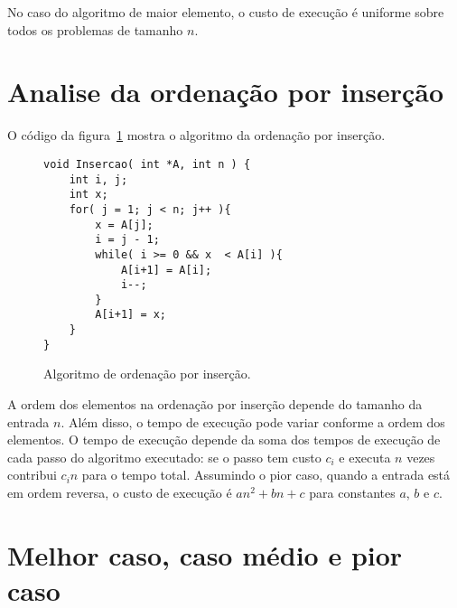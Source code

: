 No caso do algoritmo de maior elemento, o custo de execução é uniforme sobre todos os problemas 
de tamanho $n$.

\section{Analise da ordenação por inserção}
\label{aula02:sec:insertion}

O código da figura~\ref{aula02:algo:insertion} mostra o algoritmo da ordenação
por inserção.
%
\begin{figure}[!htb]
\centering
\begin{framed}
\begin{lstlisting}
void Insercao( int *A, int n ) {
	int i, j;
	int x;
	for( j = 1; j < n; j++ ){
		x = A[j];
		i = j - 1;
		while( i >= 0 && x  < A[i] ){
			A[i+1] = A[i];
			i--;
		}
		A[i+1] = x;
	}
}
\end{lstlisting}
\end{framed}
\caption{Algoritmo de ordenação por inserção.}
\label{aula02:algo:insertion}
\end{figure}
%

A ordem dos elementos na ordenação por inserção depende do tamanho da entrada $n$. 
Além disso, o tempo de execução pode variar conforme a ordem dos elementos.
%
O tempo de execução depende da soma dos tempos de execução de cada passo do algoritmo
executado: se o passo tem custo $c_i$ e executa $n$ vezes contribui $c_i n$ para o tempo
total.
Assumindo o pior caso, quando a entrada está em ordem reversa, o custo de execução é 
$an^2 + bn +c$ para constantes $a$, $b$ e $c$.


\section{Melhor caso, caso médio e pior caso}

